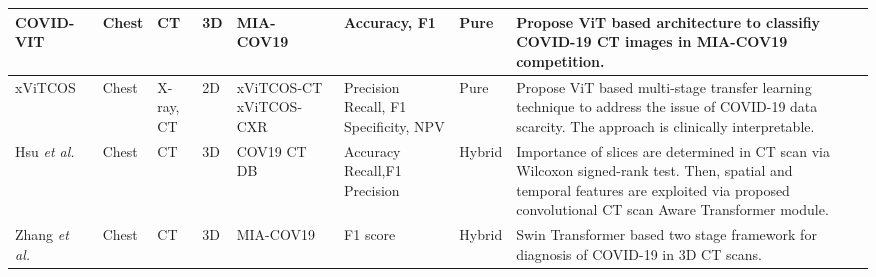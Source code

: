\begin{table}[]
{\begin{tabular}{V{3}l|l|p{2cm}|l|p{2.5cm}|p{2cm}|l|p{7cm}V{3}}
COVID-VIT~\cite{gao2021covid}                                                & Chest          & CT                                                               & 3D & MIA-COV19~\cite{kollias2021mia}                                                                              & Accuracy, F1                                            & Pure           & Propose ViT based architecture to classifiy COVID-19 CT images in MIA-COV19 competition.                                                                                                     \\ \hline

{\color{teal}xViTCOS}~\cite{mondal2021xvitcos}                                                   & Chest          & X-ray, CT                                                        &  2D                        & xViTCOS-CT~\cite{gunraj2021covid} \newline xViTCOS-CXR~\cite{wang2020covid}                     & Precision \newline Recall, F1 \newline Specificity,  NPV        & Pure           & Propose ViT based multi-stage transfer learning technique to address the issue of COVID-19 data scarcity. The approach is clinically interpretable.                                         \\ \hline

Hsu \textit{et al.}~\cite{hsu2021visual}                                                & Chest          & CT                                                              & 3D                        & COV19 CT DB~\cite{kollias2021mia}                      & Accuracy \newline Recall,F1 \newline Precision                 & Hybrid        & Importance of slices are determined in CT scan via Wilcoxon signed-rank test. Then, spatial and temporal features are exploited via proposed convolutional CT scan Aware Transformer module. \\ \hline

Zhang \textit{et al.}\cite{zhang2021transformer}                                              & Chest          & CT           & 3D                        & MIA-COV19~\cite{kollias2021mia}                                              & F1 score                                                 & Hybrid         & Swin Transformer based two stage framework for diagnosis of COVID-19 in 3D CT scans.                                                                                                          \\ \hline


\end{tabular}}
\end{table}
